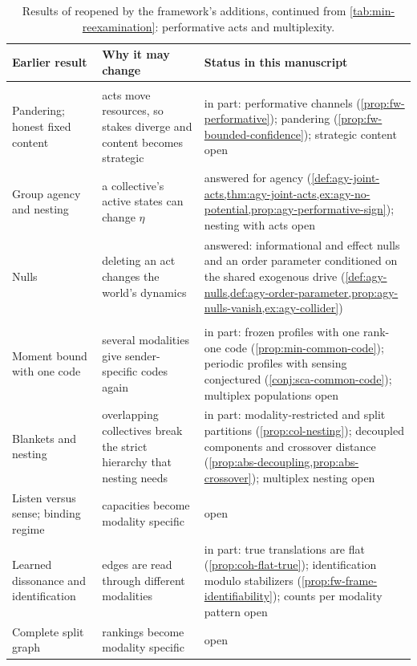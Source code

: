 \begin{table}[tp]
\centering\footnotesize
\caption{Results of \citet{dennis2026communicating} reopened by the framework's additions, continued from \cref{tab:min-reexamination}: performative acts and multiplexity.}\label{tab:min-reexamination-b}
\begin{tabular}{@{}>{\raggedright\arraybackslash}p{}>{\raggedright\arraybackslash}p{}>{\raggedright\arraybackslash}p{}@{}}
\toprule
Earlier result & Why it may change & Status in this manuscript \\
\midrule
\multicolumn{3}{@{}l}{\emph{Performative acts}} \\
Pandering; honest fixed content & acts move resources, so stakes diverge and content becomes strategic \citep{crawford1982strategic} & in part: performative channels (\cref{prop:fw-performative}); pandering (\cref{prop:fw-bounded-confidence}); strategic content open \\
Group agency and nesting & a collective's active states can change $\eta$ & answered for agency (\cref{def:agy-joint-acts,thm:agy-joint-acts,ex:agy-no-potential,prop:agy-performative-sign}); nesting with acts open \\
Nulls & deleting an act changes the world's dynamics & answered: informational and effect nulls and an order parameter conditioned on the shared exogenous drive (\cref{def:agy-nulls,def:agy-order-parameter,prop:agy-nulls-vanish,ex:agy-collider}) \\
\multicolumn{3}{@{}l}{\emph{Multiplexity}} \\
Moment bound with one code & several modalities give sender-specific codes again & in part: frozen profiles with one rank-one code (\cref{prop:min-common-code}); periodic profiles with sensing conjectured (\cref{conj:sca-common-code}); multiplex populations open \\
Blankets and nesting & overlapping collectives break the strict hierarchy that nesting needs & in part: modality-restricted and split partitions (\cref{prop:col-nesting}); decoupled components and crossover distance (\cref{prop:abs-decoupling,prop:abs-crossover}); multiplex nesting open \\
Listen versus sense; binding regime & capacities become modality specific & open \\
Learned dissonance and identification & edges are read through different modalities & in part: true translations are flat (\cref{prop:coh-flat-true}); identification modulo stabilizers (\cref{prop:fw-frame-identifiability}); counts per modality pattern open \\
Complete split graph & rankings become modality specific & open \\
\bottomrule
\end{tabular}
\end{table}

